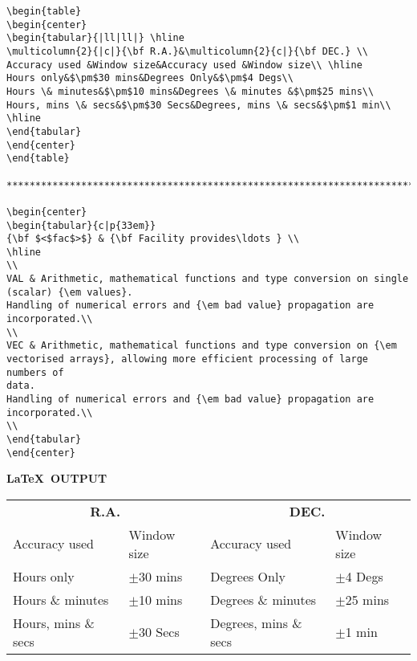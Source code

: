 \begin{verbatim}
\begin{table}
\begin{center}
\begin{tabular}{|ll|ll|} \hline
\multicolumn{2}{|c|}{\bf R.A.}&\multicolumn{2}{c|}{\bf DEC.} \\ 
Accuracy used &Window size&Accuracy used &Window size\\ \hline
Hours only&$\pm$30 mins&Degrees Only&$\pm$4 Degs\\
Hours \& minutes&$\pm$10 mins&Degrees \& minutes &$\pm$25 mins\\
Hours, mins \& secs&$\pm$30 Secs&Degrees, mins \& secs&$\pm$1 min\\ \hline
\end{tabular}
\end{center}
\end{table}

********************************************************************************

\begin{center}
\begin{tabular}{c|p{33em}}
{\bf $<$fac$>$} & {\bf Facility provides\ldots } \\
\hline
\\
VAL & Arithmetic, mathematical functions and type conversion on single 
(scalar) {\em values}.
Handling of numerical errors and {\em bad value} propagation are
incorporated.\\ 
\\ 
VEC & Arithmetic, mathematical functions and type conversion on {\em
vectorised arrays}, allowing more efficient processing of large numbers of
data. 
Handling of numerical errors and {\em bad value} propagation are
incorporated.\\ 
\\ 
\end{tabular}
\end{center}
\end{verbatim}

\newpage

\begin{center}
{\bf \LaTeX\ OUTPUT}
\end{center}

\begin{table}[h]
\begin{center}
\begin{tabular}{|ll|ll|} \hline
\multicolumn{2}{|c|}{\bf R.A.}&\multicolumn{2}{c|}{\bf DEC.} \\ 
Accuracy used &Window size&Accuracy used &Window size\\ \hline
Hours only&$\pm$30 mins&Degrees Only&$\pm$4 Degs\\
Hours \& minutes&$\pm$10 mins&Degrees \& minutes &$\pm$25 mins\\
Hours, mins \& secs&$\pm$30 Secs&Degrees, mins \& secs&$\pm$1 min\\ \hline
\end{tabular}
\end{center}
\end{table}

